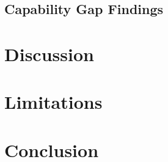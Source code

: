 \documentclass[11pt]{article}
\begin{document}
\subsection{Capability Gap Findings}

\section{Discussion}
\label{sec:discussion}


\section{Limitations}
\label{sec:limitations}


\section{Conclusion}
\label{sec:conclusion}




\end{document}
